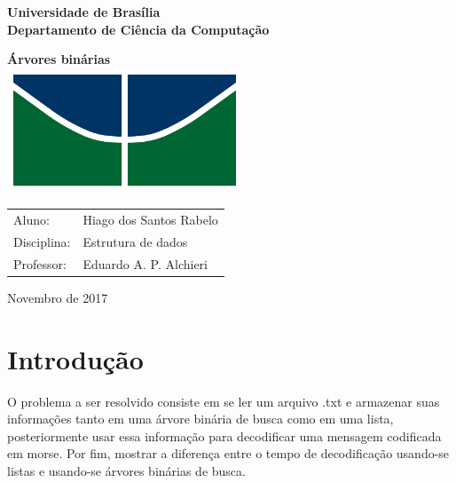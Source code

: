 \documentclass[12 pt, a4paper]{article}
\begin{document}
	\begin{titlepage}
		\begin{center}
			{\large \textbf{Universidade de Bras\'ilia}}\\
			{\large \textbf{Departamento de Ci\^encia da Computa\c{c}\~ao}}\vspace{1.0cm}

			{\Huge \textbf{\'Arvores bin\'arias}}\\[7.0cm]
			\includegraphics[height=10em]{images/CIC_header}\\[6.0cm]

		\end{center}

		\begin{table}[h]
		\begin{tabular}{l l}
		Aluno:    	& Hiago dos Santos Rabelo\\
		Disciplina:	& Estrutura de dados\\
		Professor:	& Eduardo A. P. Alchieri\vspace{1.5cm}\\

		\end{tabular}
		\end{table}


		\center \date[Novembro de 2017
			
	\end{titlepage}

\tableofcontents

\newpage
\section {Introdu\c{c}\~ao}

O problema a ser resolvido consiste em se ler um arquivo .txt e armazenar suas informa\c{c}\~oes tanto em uma \'arvore bin\'aria de busca como em uma lista, posteriormente usar essa informa\c{c}\~ao para decodificar uma mensagem codificada em morse. 
\newline
Por fim, mostrar a diferen\c{c}a entre o tempo de decodifica\c{c}\~ao usando-se listas e usando-se \'arvores bin\'arias de busca.
\end{document}
